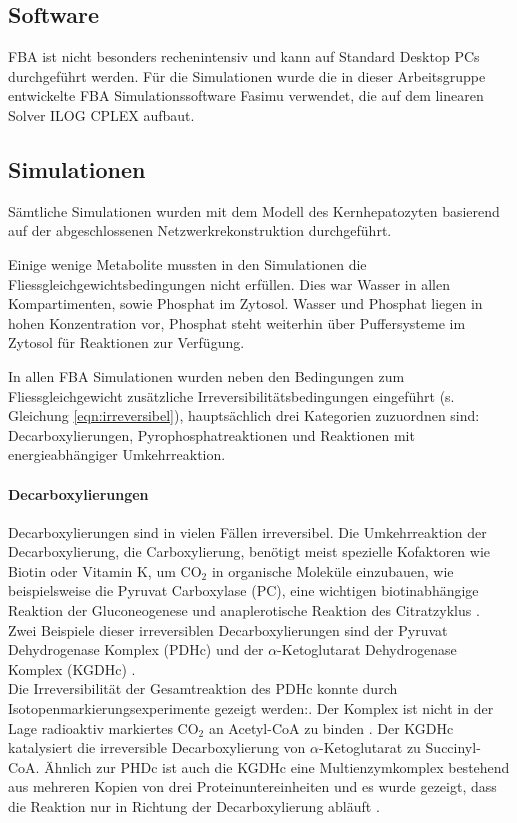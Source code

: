 \subsection{Software}
FBA ist nicht besonders rechenintensiv und kann auf Standard Desktop PCs durchgeführt werden. Für die Simulationen wurde die in dieser Arbeitsgruppe entwickelte FBA Simulationssoftware Fasimu verwendet, die auf dem linearen Solver ILOG CPLEX \cite{cplex} aufbaut.


\subsection{Simulationen}
Sämtliche Simulationen wurden mit dem Modell des Kernhepatozyten basierend auf der abgeschlossenen Netzwerkrekonstruktion durchgeführt.

Einige wenige Metabolite mussten in den Simulationen die Fliessgleichgewichtsbedingungen nicht erfüllen. Dies war Wasser in allen Kompartimenten, sowie Phosphat im Zytosol. Wasser und Phosphat liegen in hohen Konzentration vor, Phosphat steht weiterhin über Puffersysteme im Zytosol für Reaktionen zur Verfügung.

In allen FBA Simulationen wurden neben den Bedingungen zum Fliessgleichgewicht zusätzliche Irreversibilitätsbedingungen eingeführt (s. Gleichung \ref{eqn:irreversibel}), hauptsächlich drei Kategorien zuzuordnen sind: Decarboxylierungen, Pyrophosphatreaktionen und Reaktionen mit energieabhängiger Umkehrreaktion.

\paragraph{Decarboxylierungen}
Decarboxylierungen sind in vielen Fällen irreversibel. Die Umkehrreaktion der Decarboxylierung, die Carboxylierung, benötigt meist spezielle Kofaktoren wie Biotin oder Vitamin K, um $\text{CO}_2$ in organische Moleküle einzubauen, wie beispielsweise die Pyruvat Carboxylase (PC), eine wichtigen biotinabhängige Reaktion der Gluconeogenese und anaplerotische Reaktion des Citratzyklus \cite{Jitrapakdee2008}.\\
Zwei Beispiele dieser irreversiblen Decarboxylierungen sind der Pyruvat Dehydrogenase Komplex (PDHc) und der $\alpha$-Ketoglutarat Dehydrogenase Komplex (KGDHc) \cite{Reisch2007}.\\
Die Irreversibilität der Gesamtreaktion des PDHc konnte durch Isotopenmarkierungsexperimente gezeigt werden:. Der Komplex ist nicht in der Lage radioaktiv markiertes $\text{CO}_2$ an Acetyl-CoA zu binden \cite{Nelson2008}. Der KGDHc katalysiert die irreversible Decarboxylierung von $\alpha$-Ketoglutarat zu Succinyl-CoA. Ähnlich zur PHDc ist auch die KGDHc eine Multienzymkomplex bestehend aus mehreren Kopien von drei Proteinuntereinheiten und es wurde gezeigt, dass die Reaktion nur in Richtung der Decarboxylierung abläuft \cite{Reisch2007}. 

